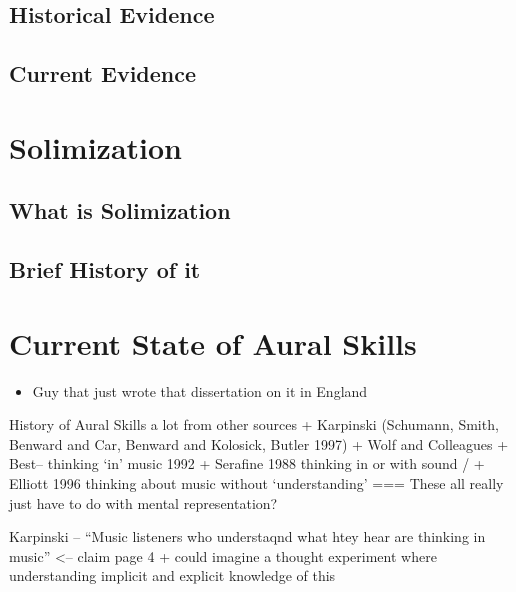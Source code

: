 \documentclass[]{book}
\providecommand{\tightlist}{%
  \setlength{\itemsep}{0pt}\setlength{\parskip}{0pt}}
\theoremstyle{definition}
\theoremstyle{definition}
\theoremstyle{definition}
\theoremstyle{remark}
\begin{document}
\hypertarget{historical-evidence}{%
\subsection{Historical Evidence}\label{historical-evidence}}

\hypertarget{current-evidence}{%
\subsection{Current Evidence}\label{current-evidence}}

\hypertarget{solimization}{%
\section{Solimization}\label{solimization}}

\hypertarget{what-is-solimization}{%
\subsection{What is Solimization}\label{what-is-solimization}}

\hypertarget{brief-history-of-it}{%
\subsection{Brief History of it}\label{brief-history-of-it}}

\hypertarget{current-state-of-aural-skills}{%
\section{Current State of Aural
Skills}\label{current-state-of-aural-skills}}

\begin{itemize}
\tightlist
\item
  Guy that just wrote that dissertation on it in England
\end{itemize}

History of Aural Skills a lot from other sources + Karpinski (Schumann,
Smith, Benward and Car, Benward and Kolosick, Butler 1997) + Wolf and
Colleagues + Best-- thinking `in' music 1992 + Serafine 1988 thinking in
or with sound / + Elliott 1996 thinking about music without
`understanding' === These all really just have to do with mental
representation?

Karpinski -- ``Music listeners who understaqnd what htey hear are
thinking in music'' \textless{}-- claim page 4 + could imagine a thought
experiment where understanding implicit and explicit knowledge of this
\end{document}
